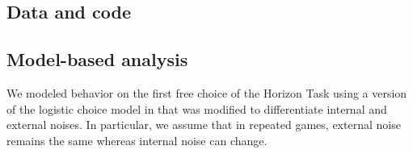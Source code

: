 \documentclass[12pt]{article}
\begin{document}
	
	
	
	
	\subsection*{Data and code}
	
	
	\subsection*{Model-based analysis}
	We modeled behavior on the first free choice of the Horizon Task using a version of the logistic choice model in \cite{} that was modified to differentiate internal and external noises. In particular, we assume that in repeated games, external noise remains the same whereas internal noise can change. 
	
	
\end{document}
